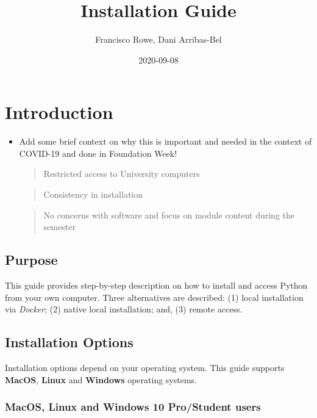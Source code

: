 \documentclass[
]{book}
\title{Installation Guide}
\author{Francisco Rowe, Dani Arribas-Bel}
\date{2020-09-08}
\begin{document}
\maketitle

{
\setcounter{tocdepth}{1}
\tableofcontents
}
\hypertarget{introduction}{%
\chapter{Introduction}\label{introduction}}

\begin{itemize}
\item
  Add some brief context on why this is important and needed in the context of COVID-19 and done in Foundation Week!

  \begin{quote}
  Restricted access to University computers
  \end{quote}

  \begin{quote}
  Consistency in installation
  \end{quote}

  \begin{quote}
  No concerns with software and focus on module content during the semester
  \end{quote}
\end{itemize}

\hypertarget{purpose}{%
\section{Purpose}\label{purpose}}

This guide provides step-by-step description on how to install and access Python from your own computer. Three alternatives are described: (1) local installation via \emph{Docker}; (2) native local installation; and, (3) remote access.

\hypertarget{installation-options}{%
\section{Installation Options}\label{installation-options}}

Installation options depend on your operating system. This guide supports \textbf{MacOS}, \textbf{Linux} and \textbf{Windows} operating systems.

\hypertarget{macos-linux-and-windows-10-prostudent-users}{%
\subsection{MacOS, Linux and Windows 10 Pro/Student users}\label{macos-linux-and-windows-10-prostudent-users}}
\end{document}
